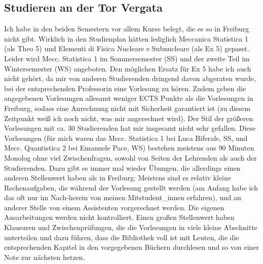 \documentclass[a4paper,12pt]{article}
\begin{document}
\subsection*{Studieren an der Tor Vergata}
Ich habe in den beiden Semestern vor allem Kurse belegt, die es so in Freiburg nicht gibt. Wirklich in den Studienplan hätten lediglich Meccanica Statistica 1 (als Theo 5) und Elementi di Fisica Nucleare e Subnucleare (als Ex 5) gepasst. Leider wird Mecc. Statistica 1 im Sommersemester (SS) und der zweite Teil im Wintersemester (WS) angeboten. Den möglichen Ersatz für Ex 5 habe ich auch nicht gehört, da mir von anderen Studierenden dringend davon abgeraten wurde, bei der entsprechenden Professorin eine Vorlesung zu hören. Zudem geben  die angegebenen Vorlesungen allesamt weniger ECTS Punkte als die Vorlesungen in Freiburg, sodass eine Anrechnung nicht mit Sicherheit garantiert ist (zu diesem Zeitpunkt weiß ich noch nicht, was mir angerechnet wird). 
Der Stil der größeren Vorlesungen mit ca. 30 Studierenden hat mir insgesamt nicht sehr gefallen. Diese Vorlesungen (für mich waren das Mecc. Statistica 1 bei Luca Biferale, SS, und Mecc. Quantistica 2 bei Emanuele Pace, WS) bestehen meistens aus 90 Minuten Monolog ohne viel Zwischenfragen, sowohl von Seiten der Lehrenden als auch der Studierenden. Dazu gibt es immer mal wieder Übungen, die allerdings einen anderen Stellenwert haben als in Freiburg: Meistens sind es relativ kleine Rechenaufgaben, die während der Vorlesung gestellt werden (am Anfang habe ich das oft nur im Nach-herein von meinen Mitstudent\_innen erfahren), und an anderer Stelle von einem Assistenten vorgerechnet werden. Die eigenen Ausarbeitungen werden nicht kontrolliert. Einen großen Stellenwert haben Klausuren und Zwischenprüfungen, die die Vorlesungen in viele kleine Abschnitte unterteilen und dazu führen, dass die Bibliothek voll ist mit Leuten, die die entsprechenden Kapitel in den vorgegebenen Büchern durchlesen und so von einer Note zur nächsten hetzen. \\
\end{document}
